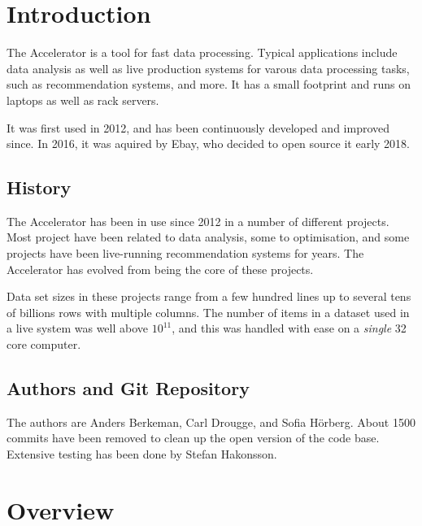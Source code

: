 \documentclass[a4paper]{article}
\begin{document}
\clearpage
\section{Introduction}
The Accelerator is a tool for fast data processing.  Typical
applications include data analysis as well as live production systems
for varous data processing tasks, such as recommendation systems, and
more.  It has a small footprint and runs on laptops as well as rack
servers.

It was first used in 2012, and has been continuously developed and
improved since.  In 2016, it was aquired by Ebay, who decided to open
source it early 2018.



\subsection{History}
The Accelerator has been in use since 2012 in a number of different
projects.  Most project have been related to data analysis, some to
optimisation, and some projects have been live-running recommendation
systems for years.  The Accelerator has evolved from being the core of
these projects.

Data set sizes in these projects range from a few hundred lines up to
several tens of billions rows with multiple columns.  The number of
items in a dataset used in a live system was well above $10^{11}$, and
this was handled with ease on a \emph{single} 32 core computer.


\subsection{Authors and Git Repository}
The authors are Anders Berkeman, Carl Drougge, and Sofia H\"orberg.
About 1500 commits have been removed to clean up the open version of
the code base.  Extensive testing has been done by Stefan Hakonsson.


\clearpage
\section{Overview}
\end{document}

